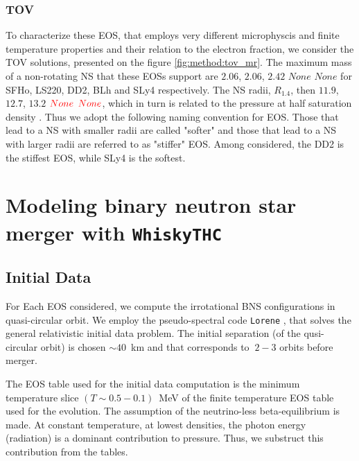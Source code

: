 \documentclass[11pt,a4paper,headinclude=true,DIV=14,BCOR=8mm,chapterprefix,listof=totoc,twoside,openright,abstracton]{scrbook}
\newcommand{\red}[1]{\textcolor{red}{#1}}
\begin{document}
\subsubsection{TOV}

To characterize these EOS, that employs very different microphyscis and finite temperature properties and their relation to the electron fraction, we consider the TOV solutions, presented on the figure \ref{fig:method:tov_mr}.
The maximum mass of a non-rotating NS that these EOSs support are $2.06$, $2.06$, $2.42$ $None$ $None$ 
for SFHo, LS220, DD2, BLh and SLy4 respectively. The NS radii, $R_{1.4}$, then $11.9$, $12.7$, $13.2$ $\red{None}$ $\red{None}$, which in turn is related to the pressure at half saturation density \cite{Lattimer:2012nd}. Thus we adopt the following naming convention for EOS. Those that lead to a NS with smaller radii are called "softer" and those that lead to a NS with larger radii are referred to as "stiffer" EOS.
Among considered, the DD2 is the stiffest EOS, while SLy4 is the softest.



\section{Modeling binary neutron star merger with \texttt{WhiskyTHC}}

\subsection{Initial Data}

For Each EOS considered, we compute the irrotational BNS configurations in quasi-circular orbit.
We employ the pseudo-spectral code \texttt{Lorene} \citep{Gourgoulhon:2000nn}, that 
solves the general relativistic initial data problem.
The initial separation (of the qusi-circular orbit) is chosen $\sim40$~km and that corresponds to $~2-3$ orbits before merger.

The EOS table used for the initial data computation is the minimum temperature slice
$(T\sim 0.5 - 0.1)$~MeV of the finite temperature EOS table used for the evolution.
The assumption of the neutrino-less beta-equilibrium is made.
At constant temperature, at lowest densities, the photon energy (radiation) is a dominant contribution to 
pressure. Thus, we substruct this contribution from the tables.
\end{document}
